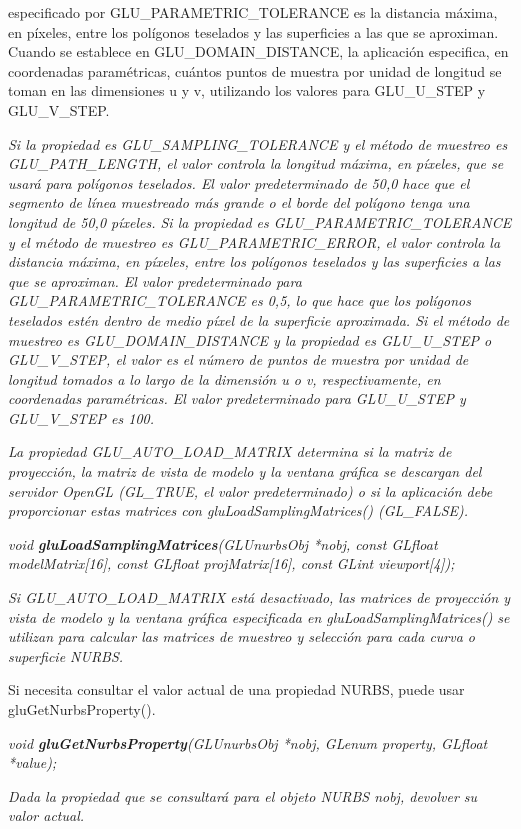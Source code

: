 \begin{description}
\begin{description}
{            especificado por GLU\_PARAMETRIC\_TOLERANCE es la distancia
            máxima, en píxeles, entre los polígonos teselados y las
            superficies a las que se aproximan. Cuando se establece
            en GLU\_DOMAIN\_DISTANCE, la aplicación especifica, en
            coordenadas paramétricas, cuántos puntos de muestra por
            unidad de longitud se toman en las dimensiones u y v,
            utilizando los valores para GLU\_U\_STEP y GLU\_V\_STEP.
        }
        \item \textit{Si la propiedad es GLU\_SAMPLING\_TOLERANCE y el método de muestreo es GLU\_PATH\_LENGTH, el valor controla la longitud máxima, en píxeles, que se usará para polígonos teselados. El valor predeterminado de 50,0 hace que el segmento de línea muestreado más grande o el borde del polígono tenga una longitud de 50,0 píxeles. Si la propiedad es GLU\_PARAMETRIC\_TOLERANCE y el método de muestreo es GLU\_PARAMETRIC\_ERROR, el valor controla la distancia máxima, en píxeles, entre los polígonos teselados y las superficies a las que se aproximan. El valor predeterminado para GLU\_PARAMETRIC\_TOLERANCE es 0,5, lo que hace que los polígonos teselados estén dentro de medio píxel de la superficie aproximada. Si el método de muestreo es GLU\_DOMAIN\_DISTANCE y la propiedad es GLU\_U\_STEP o GLU\_V\_STEP, el valor es el número de puntos de muestra por unidad de longitud tomados a lo largo de la dimensión u o v, respectivamente, en coordenadas paramétricas. El valor predeterminado para GLU\_U\_STEP y GLU\_V\_STEP es 100.
        }
        \item \textit{La propiedad GLU\_AUTO\_LOAD\_MATRIX determina si la matriz de proyección, la matriz de vista de modelo y la ventana gráfica se descargan del servidor OpenGL (GL\_TRUE, el valor predeterminado) o si la aplicación debe proporcionar estas matrices con gluLoadSamplingMatrices() (GL\_FALSE).
        }
    \end{description}
    \item \emph{void \textbf{gluLoadSamplingMatrices}(GLUnurbsObj *nobj, const GLfloat modelMatrix[16], const GLfloat projMatrix[16], const GLint viewport[4]);}
        \begin{description}
            \item \textit{Si GLU\_AUTO\_LOAD\_MATRIX está desactivado, las matrices de proyección y vista de modelo y la ventana gráfica especificada en gluLoadSamplingMatrices() se utilizan para calcular las matrices de muestreo y selección para cada curva o superficie NURBS.}
        \end{description}
    \item Si necesita consultar el valor actual de una propiedad NURBS, puede usar gluGetNurbsProperty().
    \item \emph{void \textbf{gluGetNurbsProperty}(GLUnurbsObj *nobj, GLenum property, GLfloat *value);}
        \begin{description}
            \item \textit{Dada la propiedad que se consultará para el objeto NURBS nobj, devolver su valor actual.}
        \end{description}
\end{description}

